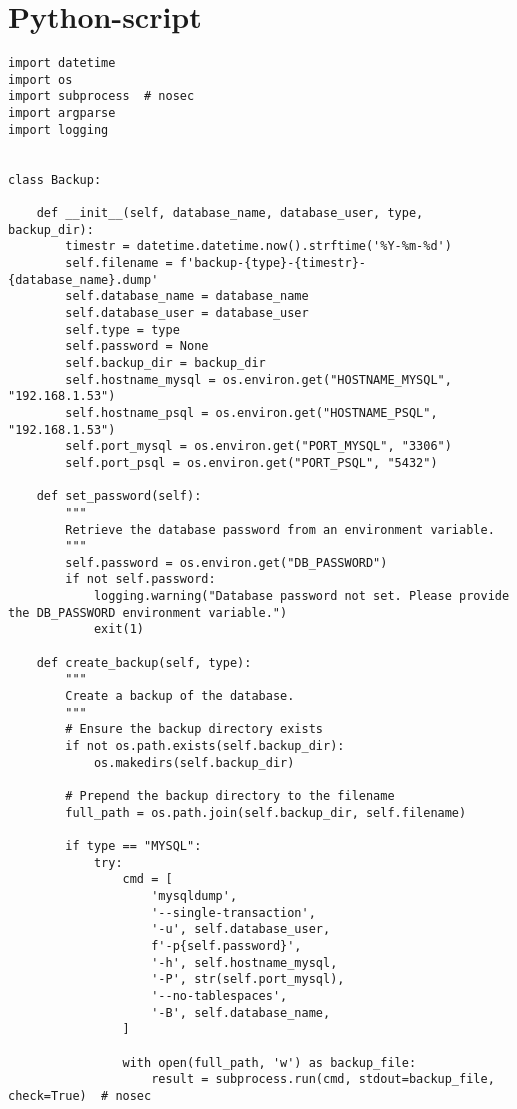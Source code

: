 \chapter{Python-script}
\label{sec:python}
\begin{lstlisting}[language=script, caption={Python-script voor back-ups en retentiebeleid.}]
import datetime
import os
import subprocess  # nosec
import argparse
import logging


class Backup:

    def __init__(self, database_name, database_user, type, backup_dir):
        timestr = datetime.datetime.now().strftime('%Y-%m-%d')
        self.filename = f'backup-{type}-{timestr}-{database_name}.dump'
        self.database_name = database_name
        self.database_user = database_user
        self.type = type
        self.password = None
        self.backup_dir = backup_dir
        self.hostname_mysql = os.environ.get("HOSTNAME_MYSQL", "192.168.1.53")
        self.hostname_psql = os.environ.get("HOSTNAME_PSQL", "192.168.1.53")
        self.port_mysql = os.environ.get("PORT_MYSQL", "3306")
        self.port_psql = os.environ.get("PORT_PSQL", "5432")

    def set_password(self):
        """
        Retrieve the database password from an environment variable.
        """
        self.password = os.environ.get("DB_PASSWORD")
        if not self.password:
            logging.warning("Database password not set. Please provide the DB_PASSWORD environment variable.")
            exit(1)

    def create_backup(self, type):
        """
        Create a backup of the database.
        """
        # Ensure the backup directory exists
        if not os.path.exists(self.backup_dir):
            os.makedirs(self.backup_dir)

        # Prepend the backup directory to the filename
        full_path = os.path.join(self.backup_dir, self.filename)

        if type == "MYSQL":
            try:
                cmd = [
                    'mysqldump',
                    '--single-transaction',
                    '-u', self.database_user,
                    f'-p{self.password}',
                    '-h', self.hostname_mysql,
                    '-P', str(self.port_mysql),
                    '--no-tablespaces',
                    '-B', self.database_name,
                ]

                with open(full_path, 'w') as backup_file:
                    result = subprocess.run(cmd, stdout=backup_file, check=True)  # nosec


\end{lstlisting}
